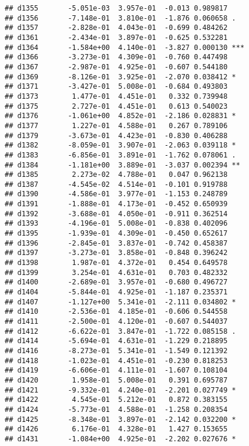 \documentclass[
]{article}
\begin{document}
\begin{verbatim}
## d1355       -5.051e-03  3.957e-01  -0.013 0.989817    
## d1356       -7.148e-01  3.810e-01  -1.876 0.060658 .  
## d1357       -2.828e-01  4.043e-01  -0.699 0.484262    
## d1361       -2.434e-01  3.897e-01  -0.625 0.532281    
## d1364       -1.584e+00  4.140e-01  -3.827 0.000130 ***
## d1366       -3.273e-01  4.309e-01  -0.760 0.447498    
## d1367       -2.987e-01  4.925e-01  -0.607 0.544180    
## d1369       -8.126e-01  3.925e-01  -2.070 0.038412 *  
## d1371       -3.427e-01  5.008e-01  -0.684 0.493803    
## d1373        1.477e-01  4.451e-01   0.332 0.739948    
## d1375        2.727e-01  4.451e-01   0.613 0.540023    
## d1376       -1.061e+00  4.852e-01  -2.186 0.028831 *  
## d1377        1.227e-01  4.588e-01   0.267 0.789106    
## d1379       -3.673e-01  4.423e-01  -0.830 0.406288    
## d1382       -8.059e-01  3.907e-01  -2.063 0.039118 *  
## d1383       -6.856e-01  3.891e-01  -1.762 0.078061 .  
## d1384       -1.181e+00  3.889e-01  -3.037 0.002394 ** 
## d1385        2.273e-02  4.788e-01   0.047 0.962138    
## d1387       -4.545e-02  4.514e-01  -0.101 0.919788    
## d1390       -4.586e-01  3.977e-01  -1.153 0.248789    
## d1391       -1.888e-01  4.173e-01  -0.452 0.650939    
## d1392       -3.688e-01  4.050e-01  -0.911 0.362514    
## d1393       -4.196e-01  5.008e-01  -0.838 0.402096    
## d1395       -1.939e-01  4.309e-01  -0.450 0.652617    
## d1396       -2.845e-01  3.837e-01  -0.742 0.458387    
## d1397       -3.273e-01  3.858e-01  -0.848 0.396242    
## d1398        1.987e-01  4.372e-01   0.454 0.649578    
## d1399        3.254e-01  4.631e-01   0.703 0.482332    
## d1400       -2.689e-01  3.957e-01  -0.680 0.496727    
## d1404       -5.844e-01  4.925e-01  -1.187 0.235371    
## d1407       -1.127e+00  5.341e-01  -2.111 0.034802 *  
## d1410       -2.536e-01  4.185e-01  -0.606 0.544558    
## d1411       -2.500e-01  4.120e-01  -0.607 0.544037    
## d1412       -6.622e-01  3.847e-01  -1.722 0.085158 .  
## d1414       -5.694e-01  4.631e-01  -1.229 0.218895    
## d1416       -8.273e-01  5.341e-01  -1.549 0.121392    
## d1418       -1.023e-01  4.451e-01  -0.230 0.818253    
## d1419       -6.606e-01  4.111e-01  -1.607 0.108104    
## d1420        1.958e-01  5.008e-01   0.391 0.695787    
## d1421       -9.332e-01  4.240e-01  -2.201 0.027749 *  
## d1422        4.545e-01  5.212e-01   0.872 0.383155    
## d1424       -5.773e-01  4.588e-01  -1.258 0.208354    
## d1425       -8.348e-01  3.897e-01  -2.142 0.032200 *  
## d1426        6.176e-01  4.328e-01   1.427 0.153655    
## d1431       -1.084e+00  4.925e-01  -2.202 0.027676 *  

\end{verbatim}
\end{document}
